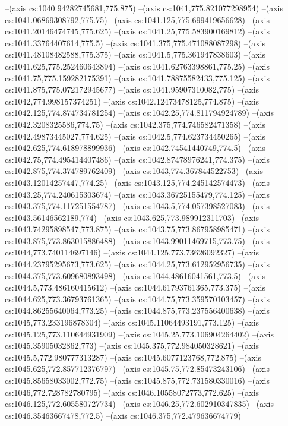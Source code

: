 --(axis cs:1040.94282745681,775.875)
--(axis cs:1041,775.821077298954)
--(axis cs:1041.06869308792,775.75)
--(axis cs:1041.125,775.699419656628)
--(axis cs:1041.20146474745,775.625)
--(axis cs:1041.25,775.583900169812)
--(axis cs:1041.33764407614,775.5)
--(axis cs:1041.375,775.471088087298)
--(axis cs:1041.48108482588,775.375)
--(axis cs:1041.5,775.361947838603)
--(axis cs:1041.625,775.252460643894)
--(axis cs:1041.62763398861,775.25)
--(axis cs:1041.75,775.159282175391)
--(axis cs:1041.78875582433,775.125)
--(axis cs:1041.875,775.072172945677)
--(axis cs:1041.95907310082,775)
--(axis cs:1042,774.998157374251)
--(axis cs:1042.12473478125,774.875)
--(axis cs:1042.125,774.874734781254)
--(axis cs:1042.25,774.811794924789)
--(axis cs:1042.3208325586,774.75)
--(axis cs:1042.375,774.746582471358)
--(axis cs:1042.49873445027,774.625)
--(axis cs:1042.5,774.623734450265)
--(axis cs:1042.625,774.618978899936)
--(axis cs:1042.74541440749,774.5)
--(axis cs:1042.75,774.495414407486)
--(axis cs:1042.87478976241,774.375)
--(axis cs:1042.875,774.374789762409)
--(axis cs:1043,774.367844522753)
--(axis cs:1043.12014257447,774.25)
--(axis cs:1043.125,774.245142574473)
--(axis cs:1043.25,774.240615303674)
--(axis cs:1043.36725155479,774.125)
--(axis cs:1043.375,774.117251554787)
--(axis cs:1043.5,774.057398527083)
--(axis cs:1043.56146562189,774)
--(axis cs:1043.625,773.989912311703)
--(axis cs:1043.74295898547,773.875)
--(axis cs:1043.75,773.867958985471)
--(axis cs:1043.875,773.863015886488)
--(axis cs:1043.99011469715,773.75)
--(axis cs:1044,773.740114697146)
--(axis cs:1044.125,773.73626092327)
--(axis cs:1044.23795295673,773.625)
--(axis cs:1044.25,773.612952956735)
--(axis cs:1044.375,773.609680893498)
--(axis cs:1044.48616041561,773.5)
--(axis cs:1044.5,773.486160415612)
--(axis cs:1044.61793761365,773.375)
--(axis cs:1044.625,773.36793761365)
--(axis cs:1044.75,773.359570103457)
--(axis cs:1044.86255640064,773.25)
--(axis cs:1044.875,773.237556400638)
--(axis cs:1045,773.233196878304)
--(axis cs:1045.11064493191,773.125)
--(axis cs:1045.125,773.110644931909)
--(axis cs:1045.25,773.106904264402)
--(axis cs:1045.35905032862,773)
--(axis cs:1045.375,772.984050328621)
--(axis cs:1045.5,772.980777313287)
--(axis cs:1045.6077123768,772.875)
--(axis cs:1045.625,772.857712376797)
--(axis cs:1045.75,772.85473243106)
--(axis cs:1045.85658033002,772.75)
--(axis cs:1045.875,772.731580330016)
--(axis cs:1046,772.728782780795)
--(axis cs:1046.10558072773,772.625)
--(axis cs:1046.125,772.605580727734)
--(axis cs:1046.25,772.602910347835)
--(axis cs:1046.35463667478,772.5)
--(axis cs:1046.375,772.479636674779)
